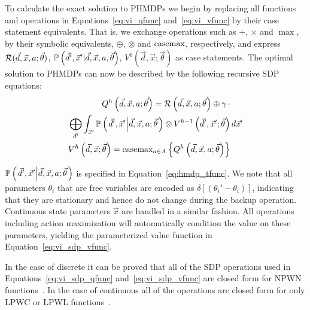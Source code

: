 To calculate the exact solution to PHMDPs we begin by replacing all functions and operations in Equations~\eqref{eq:vi_qfunc} and~\eqref{eq:vi_vfunc} by their case statement equivalents. That is, we exchange operations such as {\footnotesize$+$}, {\footnotesize$\times$} and {\footnotesize$\max$}, by their symbolic equivalents, {\footnotesize$\oplus$}, {\footnotesize$\otimes$} and $\mathrm{casemax}$, respectively, and express {\footnotesize $\mathcal{R}(\vec{d}, \vec{x}, a; \vec{\theta})$},  {\footnotesize $\mathbb{P}\left({\vec{d}', \vec{x}' | \vec{d}, \vec{x}, a, \vec{\theta}}\right)$}, {\footnotesize $V^0(\vec{d}, \vec{x}; \vec{\theta})$} as case statements. The optimal solution to PHMDPs can now be described by the following recursive SDP equations:
{\footnotesize 
    \abovedisplayskip=0pt
    \belowdisplayskip=0pt
    \begin{align}
        Q^{h} \left( \vec{d}, \vec{x}, a; \vec{\theta} \right) = \mathcal{R} \left( \vec{d}, \vec{x}, a; \vec{\theta} \right) \oplus \gamma \, \cdot &  \nonumber \\ 
        \bigoplus_{\vec{d}'} \int_{\vec{x}'} \mathbb{P}\left({ \left. \vec{d}', \vec{x}' \middle| \vec{d}, \vec{x}, a; \vec{\theta} \right.}\right) \otimes V^{h-1} \left( \vec{d}', \vec{x}'; \vec{\theta} \right) & \, d\vec{x}'  \label{eq:vi_sdp_qfunc} \\
        V^{h}\left( \vec{d}, \vec{x}; \vec{\theta} \right) = \mathrm{casemax}_{a \in A} \left\{ Q^{h} \left( \vec{d}, \vec{x}, a; \vec{\theta} \right) \right\} & \label{eq:vi_sdp_vfunc}
    \end{align}
}%

{\footnotesize $\mathbb{P}\left({\left. \vec{d}', \vec{x}' \middle| \vec{d}, \vec{x}, a; \vec{\theta} \right.}\right)$ } is specified in Equation~\eqref{eq:hmdp_tfunc}. We note that all parameters {\footnotesize $\theta_i$} that are free variables 
are encoded as {\footnotesize $\delta\left[\left(\theta_i' - \theta_i\right)\right]$}, indicating that they are stationary and hence do not change during the backup operation. Continuous state parameters {\footnotesize $ \vec{x} $} are handled in a similar fashion. All operations including action maximization will automatically condition the value on these parameters, yielding the parameterized value function in Equation~\eqref{eq:vi_sdp_vfunc}.

In the case of discrete {\footnotesize \Action} it can be proved that all of the SDP operations used in Equations~\eqref{eq:vi_sdp_qfunc} and~\eqref{eq:vi_sdp_vfunc} are closed form for NPWN functions~\parencite{Sanner_UAI_2011}. In the case of continuous {\footnotesize \Action} all of the operations are closed form for only LPWC or LPWL functions~\parencite{Zamani_AAAI_2012}.

